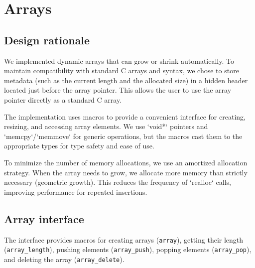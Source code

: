 \chapter{Arrays}\label{chap:arrays}

\section{Design rationale}

We implemented dynamic arrays that can grow or shrink automatically. To maintain compatibility with standard C arrays and syntax, we chose to store metadata (such as the current length and the allocated size) in a hidden header located just before the array pointer. This allows the user to use the array pointer directly as a standard C array.

The implementation uses macros to provide a convenient interface for creating, resizing, and accessing array elements. We use `void*` pointers and `memcpy`/`memmove` for generic operations, but the macros cast them to the appropriate types for type safety and ease of use.

To minimize the number of memory allocations, we use an amortized allocation strategy. When the array needs to grow, we allocate more memory than strictly necessary (geometric growth). This reduces the frequency of `realloc` calls, improving performance for repeated insertions.

\section{Array interface}\label{arrays:interface}

The interface provides macros for creating arrays (\texttt{array}), getting their length (\texttt{array\_length}), pushing elements (\texttt{array\_push}), popping elements (\texttt{array\_pop}), and deleting the array (\texttt{array\_delete}).

\begin{code}
  
  \caption{Interface for (possibly variable-length) arrays.}
\end{code}
